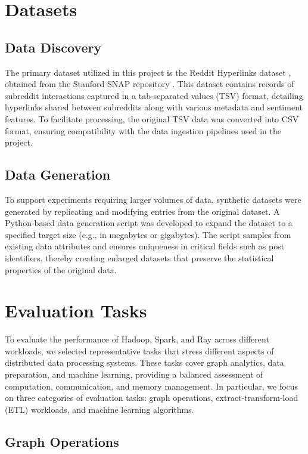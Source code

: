 \documentclass[conference]{IEEEtran}
\begin{document}
\section{Datasets}

\subsection{Data Discovery}
The primary dataset utilized in this project is the Reddit Hyperlinks dataset \cite{kumar2018community},
obtained from the Stanford SNAP repository \cite{reddit_snap}. This dataset contains records of
subreddit interactions captured in a tab-separated values (TSV) format,
detailing hyperlinks shared between subreddits along with various metadata and
sentiment features. To facilitate processing, the original TSV data was
converted into CSV format, ensuring compatibility with the data ingestion
pipelines used in the project.

\subsection{Data Generation}
To support experiments requiring larger volumes of data, synthetic datasets
were generated by replicating and modifying entries from the original dataset.
A Python-based data generation script was developed to expand the dataset to a
specified target size (e.g., in megabytes or gigabytes). The script samples
from existing data attributes and ensures uniqueness in critical fields such
as post identifiers, thereby creating enlarged datasets that preserve the
statistical properties of the original data.

\section{Evaluation Tasks}

To evaluate the performance of Hadoop, Spark, and Ray across different
workloads, we selected representative tasks that stress different aspects
of distributed data processing systems. These tasks cover graph analytics,
data preparation, and machine learning, providing a balanced assessment of
computation, communication, and memory management. In particular, we focus
on three categories of evaluation tasks: graph operations,
extract-transform-load (ETL) workloads, and machine learning algorithms.  

\subsection{Graph Operations}
\end{document}
